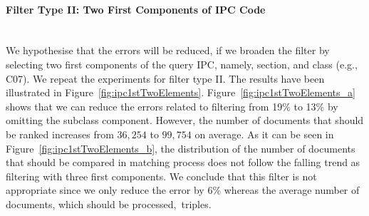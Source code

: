 \paragraph{Filter Type II: Two First Components of IPC Code}
\ \\
We hypothesise that the errors will be reduced, if we broaden the filter by selecting two first components of the query IPC, namely, section, and class (e.g., C07). We repeat the experiments for filter type II.
The results have been illustrated in Figure~\ref{fig:ipc1stTwoElements}. Figure~\ref{fig:ipc1stTwoElements_a} shows that we can reduce the errors related to filtering from 19\% to 13\% by omitting the subclass component. However, the number of documents that should be ranked increases from $ 36,254 $ to $ 99,754 $ on average. As it can be seen in Figure~\ref{fig:ipc1stTwoElements_b}, the distribution of the number of documents that should be compared in matching process does not follow the falling trend as filtering with three first components. We conclude that this filter is not appropriate since we only reduce the error by 6\% whereas the average number of documents, which should be processed,~triples.    
